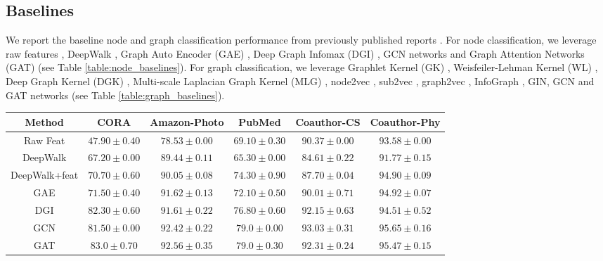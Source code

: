 \documentclass{article}
\theoremstyle{plain}
\theoremstyle{definition}
\theoremstyle{remark}
\begin{document}
\subsection{Baselines}

We report the baseline node and graph classification performance from previously published reports \citep{hassani2020contrastive, you2020graph, zhu2021graph, xu2021infogcl}. For node classification, we leverage raw features \citep{velickovic2019deep}, DeepWalk \citep{perozzi2014deepwalk}, Graph Auto Encoder (GAE) \citep{kipf2016variational}, Deep Graph Infomax (DGI) \citep{velickovic2019deep}, GCN networks and Graph Attention Networks (GAT) \citep{velivckovic2017graph} (see Table \ref{table:node_baselines}). For graph classification, we leverage Graphlet Kernel (GK) \citep{shervashidze2009efficient}, Weisfeiler-Lehman Kernel (WL) \citep{shervashidze2011weisfeiler}, Deep Graph Kernel (DGK) \citep{yanardag2015deep}, Multi-scale Laplacian Graph Kernel (MLG) \citep{kondor2016multiscale}, node2vec \citep{grover2016node2vec}, sub2vec \citep{adhikari2018sub2vec}, graph2vec \citep{narayanan2017graph2vec}, InfoGraph \citep{sun2019infograph}, GIN, GCN and GAT networks (see Table \ref{table:graph_baselines}).


\begin{table*}[ht!]
\centering
\caption{Baseline node classification accuracies from published reports. }
\label{table:node_baselines}
\vskip 0.15in
\begin{center}
\begin{small}
\begin{sc}
\begin{tabular}{c|c|c|c|c|c}
\toprule
Method & CORA & Amazon-Photo & PubMed & Coauthor-CS & Coauthor-Phy \\
\midrule
Raw Feat & $47.90 \pm 0.40$ & $ 78.53 \pm 0.00$ & $ 69.10 \pm 0.30$ & $90.37 \pm 0.00$ & $93.58 \pm 0.00$  \\
DeepWalk & $67.20 \pm 0.00$ & $89.44 \pm 0.11$ & $65.30 \pm 0.00$ & $84.61 \pm 0.22$ & $91.77 \pm 0.15$ \\
DeepWalk+feat & $70.70 \pm 0.60$ & $90.05 \pm 0.08$ & $74.30 \pm 0.90$ & $87.70 \pm 0.04$ & $ 94.90 \pm 0.09$ \\
GAE & $71.50 \pm 0.40$ & $91.62 \pm 0.13$ & $72.10 \pm 0.50$ & $90.01 \pm 0.71$ & $94.92 \pm 0.07$ \\
DGI & $82.30 \pm 0.60$ & $ 91.61 \pm 0.22$ & $76.80 \pm 0.60$ & $92.15 \pm 0.63$ &  $94.51 \pm 0.52$ \\
\midrule
GCN & $81.50 \pm 0.00$ & $92.42 \pm 0.22$ & $79.0 \pm 0.00$ & $ 93.03 \pm 0.31$ & $95.65 \pm 0.16$  \\
GAT & $83.0 \pm 0.70$ & $92.56 \pm 0.35$ & $79.0 \pm 0.30$ & $92.31 \pm 0.24$ & $95.47 \pm 0.15$ \\
\bottomrule
\end{tabular}
\end{sc}
\end{small}
\end{center}
\vskip -0.1in
\end{table*}
\end{document}
